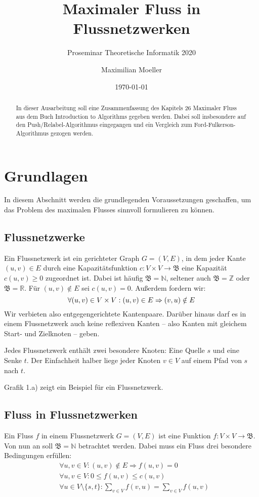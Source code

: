 \documentclass[12pt,a4paper,titlepage,onecolumn,ngerman,draft]{scrartcl}
\author{Maximilian Moeller}
\title{Maximaler Fluss in Flussnetzwerken}
\subtitle{Proseminar Theoretische Informatik 2020}
\date{\today}
\newcommand{\ff}{Ford-Fulkerson}
\newcommand{\pr}{Push/Relabel}
\begin{document}
\maketitle
\nocite{Cormen09}

\tableofcontents

\begin{abstract}
In dieser Ausarbeitung soll eine Zusammenfassung des Kapitels 26 \glqq Maximaler Fluss\grqq{} aus dem Buch \glqq Introduction to Algorithms \grqq{} \citep{Cormen09} gegeben werden. 
Dabei soll insbesondere auf den \pr -Algorithmus eingegangen und ein Vergleich zum \ff -Algorithmus gezogen werden.
\end{abstract}

\section{Grundlagen}
In diesem Abschnitt werden die grundlegenden Voraussetzungen geschaffen, um das Problem des maximalen Flusses sinnvoll formulieren zu können.

\subsection{Flussnetzwerke}
Ein Flussnetzwerk ist ein gerichteter Graph $G = (V,E)$, in dem jeder Kante $(u,v) \in E$ durch eine Kapazitätsfunktion $c: V\times V\to\mathfrak{B}$ eine Kapazität $c(u,v) \geq 0$ zugeordnet ist.
Dabei ist häufig $\mathfrak{B} = \mathbb{N}$, seltener auch $\mathfrak{B} = \mathbb{Z}$ oder $\mathfrak{B} = \mathbb{R}$.
Für $(u,v) \notin E$ sei $c(u,v) = 0$.
Außerdem fordern wir:
\begin{equation} \label{no_parallel}
\forall (u,v)\in V\times V: (u,v)\in E \Rightarrow (v,u)\notin E\\
\end{equation}
Wir verbieten also entgegengerichtete Kantenpaare.
Darüber hinaus darf es in einem Flussnetzwerk auch keine reflexiven Kanten -- also Kanten mit gleichem Start- und Zielknoten -- geben.

Jedes Flussnetzwerk enthält zwei besondere Knoten: Eine Quelle $s$ und eine Senke $t$.
Der Einfachheit halber liege jeder Knoten $v \in V$ auf einem Pfad von $s$ nach $t$.

Grafik 1.a) zeigt ein Beispiel für ein Flussnetzwerk.

\subsection{Fluss in Flussnetzwerken}
Ein Fluss $f$ in einem Flussnetzwerk $G=(V,E)$ ist eine Funktion $f: V \times V \to \mathfrak{B}$. Von nun an soll $\mathfrak{B} = \mathbb{N}$ betrachtet werden.
Dabei muss ein Fluss drei besondere Bedingungen erfüllen:
\begin{align}
&\forall u,v\in V\colon (u,v)\notin E\Rightarrow f(u,v) = 0 \label{only_on_edges} \\
&\forall u,v\in V\colon 0\leq f(u,v)\leq c(u,v) \label{limited_by_capacity} \\
&\forall u\in V\setminus\{s,t\}\colon\sum_{v\in V} f(v,u) = \sum_{v\in V} f(u,v) \label{flow_continuation}
\end{align}
\end{document}
